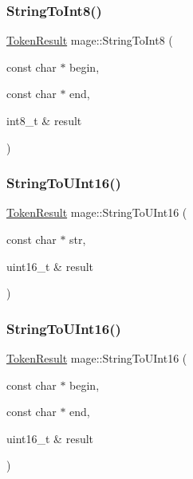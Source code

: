 \hypertarget{namespacemage_a0bd81bf259563dd9de793ada42405c95}{}\label{namespacemage_a0bd81bf259563dd9de793ada42405c95} 
\subsubsection{\texorpdfstring{String\+To\+Int8()}{StringToInt8()}\hspace{0.1cm}{\footnotesize\ttfamily [2/2]}}
{\footnotesize\ttfamily \hyperlink{namespacemage_a2178ba2411db5912f41b2e7698c2037d}{Token\+Result} mage\+::\+String\+To\+Int8 (\begin{DoxyParamCaption}\item[{const char $\ast$}]{begin,  }\item[{const char $\ast$}]{end,  }\item[{int8\+\_\+t \&}]{result }\end{DoxyParamCaption})}

\hypertarget{namespacemage_aa1be9dbfa0799457b0de019d451cd5ca}{}\label{namespacemage_aa1be9dbfa0799457b0de019d451cd5ca} 
\subsubsection{\texorpdfstring{String\+To\+U\+Int16()}{StringToUInt16()}\hspace{0.1cm}{\footnotesize\ttfamily [1/2]}}
{\footnotesize\ttfamily \hyperlink{namespacemage_a2178ba2411db5912f41b2e7698c2037d}{Token\+Result} mage\+::\+String\+To\+U\+Int16 (\begin{DoxyParamCaption}\item[{const char $\ast$}]{str,  }\item[{uint16\+\_\+t \&}]{result }\end{DoxyParamCaption})}

\hypertarget{namespacemage_a12bd34f17d7d39ac8d054be9293efe54}{}\label{namespacemage_a12bd34f17d7d39ac8d054be9293efe54} 
\subsubsection{\texorpdfstring{String\+To\+U\+Int16()}{StringToUInt16()}\hspace{0.1cm}{\footnotesize\ttfamily [2/2]}}
{\footnotesize\ttfamily \hyperlink{namespacemage_a2178ba2411db5912f41b2e7698c2037d}{Token\+Result} mage\+::\+String\+To\+U\+Int16 (\begin{DoxyParamCaption}\item[{const char $\ast$}]{begin,  }\item[{const char $\ast$}]{end,  }\item[{uint16\+\_\+t \&}]{result }\end{DoxyParamCaption})}

